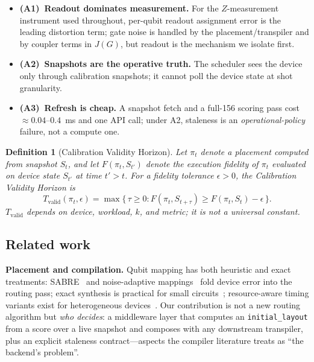 \documentclass[journal,10pt,twocolumn]{IEEEtran}
\newtheorem{definition}{Definition}
\begin{document}
\begin{itemize}[leftmargin=1.1em,itemsep=1pt,topsep=2pt]
\item \textbf{(A1)~Readout dominates measurement.} For the $Z$-measurement instrument used throughout, per-qubit
readout assignment error is the leading distortion term; gate noise is handled by the placement/transpiler and by
coupler terms in $J(G)$, but readout is the mechanism we isolate first.
\item \textbf{(A2)~Snapshots are the operative truth.} The scheduler sees the device only through calibration
snapshots; it cannot poll the device state at shot granularity.
\item \textbf{(A3)~Refresh is cheap.} A snapshot fetch and a full-156 scoring pass cost $\approx0.04$--$0.4$~ms and
one API call; under A2, staleness is an \emph{operational-policy} failure, not a compute one.
\end{itemize}

\begin{definition}[Calibration Validity Horizon]
\label{def:tvalid}
Let $\pi_t$ denote a placement computed from snapshot $S_t$, and let $F(\pi_t, S_{t'})$ denote the execution
fidelity of $\pi_t$ evaluated on device state $S_{t'}$ at time $t' > t$. For a fidelity tolerance
$\epsilon > 0$, the \emph{Calibration Validity Horizon} is
\begin{equation}
T_{\mathrm{valid}}(\pi_t, \epsilon) = \max\{\,\tau \ge 0 : F(\pi_t, S_{t+\tau}) \ge F(\pi_t, S_t) - \epsilon\,\}.
\label{eq:tvalid}
\end{equation}
$T_{\mathrm{valid}}$ depends on device, workload, $k$, and metric; it is not a universal constant.
\end{definition}

\subsection{Related work}
\label{sec:related2}
\textbf{Placement and compilation.} Qubit mapping has both heuristic and exact treatments: SABRE~\cite{li2019sabre}
and noise-adaptive mappings~\cite{murali2019noise} fold device error into the routing pass; exact synthesis is
practical for small circuits~\cite{tan2020iccado}; resource-aware timing variants exist for heterogeneous
devices~\cite{lao2022timing}. Our contribution is not a new routing algorithm but \emph{who decides}: a middleware
layer that computes an \texttt{initial\_layout} from a score over a live snapshot and composes with any downstream
transpiler, plus an explicit staleness contract---aspects the compiler literature treats as ``the backend's
problem''.
\end{document}
